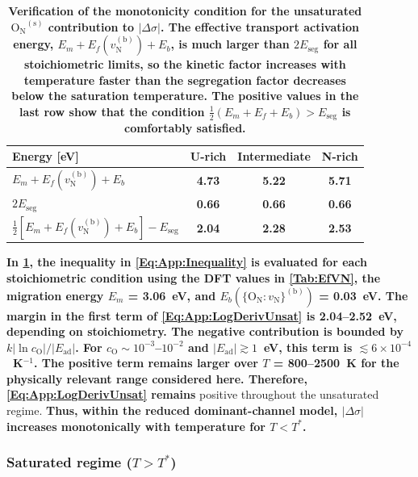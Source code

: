 \documentclass[preprint,12pt,sort&compress]{elsarticle}
\newcommand{\?}{\stackrel{?}{=}}
\providecommand{\DIFaddtex}[1]{{\bf #1}} %
\providecommand{\DIFaddbegin}{\protect\color{blue}} %
\providecommand{\DIFaddend}{\protect\color{black}} %
\providecommand{\DIFaddFL}[1]{\DIFadd{#1}} %
\providecommand{\DIFadd}[1]{\texorpdfstring{\DIFaddtex{#1}}{#1}} %
\begin{document}
\begin{table}[h!]
\footnotesize
\centering
\caption{\DIFaddFL{Verification of the monotonicity condition for the unsaturated $\mathrm{O_N}^{(\mathrm{s})}$ contribution to $|\Delta\sigma|$. The effective transport activation energy, $E_m+E_f(v_\text{N}^{(\text{b})})+E_b$, is much larger than $2E_\text{seg}$ for all stoichiometric limits, so the kinetic factor increases with temperature faster than the segregation factor decreases below the saturation temperature. The positive values in the last row show that the condition $\tfrac{1}{2}(E_m+E_f+E_b)>E_\text{seg}$ is comfortably satisfied.}}
\begin{tabular}{lccc}
\hline
\DIFaddFL{Energy }[\DIFaddFL{eV}] & \DIFaddFL{U-rich }& \DIFaddFL{Intermediate }& \DIFaddFL{N-rich }\\
\hline
\DIFaddFL{$E_m + E_f(v_\text{N}^{(\text{b})}) + E_b$ }& \DIFaddFL{4.73 }& \DIFaddFL{5.22 }& \DIFaddFL{5.71 }\\
\DIFaddFL{$2E_\text{seg}$ }& \DIFaddFL{0.66 }& \DIFaddFL{0.66 }& \DIFaddFL{0.66 }\\
\DIFaddFL{$\tfrac{1}{2}[E_m + E_f(v_\text{N}^{(\text{b})})+E_b] - E_\text{seg}$ }& \DIFaddFL{2.04 }& \DIFaddFL{2.28 }& \DIFaddFL{2.53 }\\
\hline
\end{tabular}
\label{Tab:App:monotonicity}
\end{table}

\DIFadd{In \cref{Tab:App:monotonicity}, the inequality in \cref{Eq:App:Inequality} is evaluated for each stoichiometric condition using the DFT values in \cref{Tab:EfVN}, the migration energy $E_m$ = 3.06~eV, and $E_b(\{\text{O}_\text{N}:v_\text{N}\}^{(\text{b})})$ = 0.03~eV. The margin in the first term of \cref{Eq:App:LogDerivUnsat} is 2.04--2.52~eV, depending on stoichiometry. The negative contribution is bounded by $k|\ln c_\text{O}|/|E_\text{ad}|$. For $c_\text{O}\sim10^{-3}$--$10^{-2}$ and $|E_\text{ad}|\gtrsim1$~eV, this term is $\lesssim 6\times10^{-4}$~K$^{-1}$. The positive term remains larger over $T$ = 800--2500~K for the physically relevant range considered here. Therefore, \cref{Eq:App:LogDerivUnsat} remains }\DIFaddend positive throughout the unsaturated regime. \DIFaddbegin \DIFadd{Thus, within the reduced dominant-channel model, $|\Delta\sigma|$ increases monotonically with temperature for $T<T^*$.
}\DIFaddend 

\subsubsection{Saturated regime (\texorpdfstring{$T > T^*$}{T > T*})}
\end{document}
